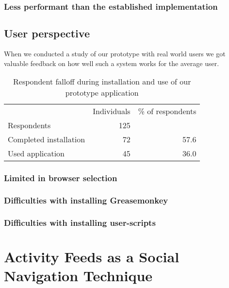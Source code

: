 \subsubsection{Less performant than the established implementation}

\subsection{User perspective}

When we conducted a study of our prototype with real world users
we got valuable feedback on how well such a system works for the average user.

\begin{table}[h]
  \begin{tabular}{lrr}

    &
    \multicolumn{1}{c}{Individuals} &
    \multicolumn{1}{c}{\% of respondents} \\

    \cmidrule(lr){2-2}
    \cmidrule(lr){3-3}

    Respondents &
    125 &
    \\

    Completed installation &
    72 &
    57.6 \\

    Used application &
    45 &
    36.0 \\

  \end{tabular}
  \caption[Respondents Falloff]{%
    Respondent falloff during installation and use of our prototype
    application}
  \label{table:respondents.falloff}
\end{table}

\subsubsection{Limited in browser selection}

\subsubsection{Difficulties with installing Greasemonkey}

\subsubsection{Difficulties with installing user-scripts}


\section{Activity Feeds as a Social Navigation Technique}
